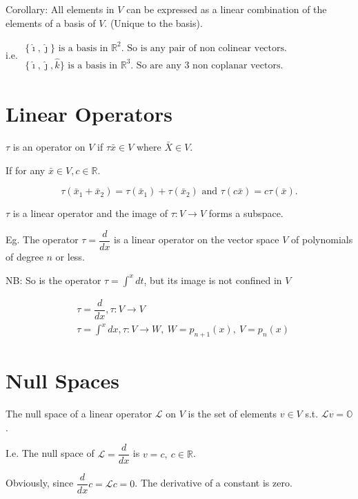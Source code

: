 \documentclass{report}
\begin{document}
Corollary: All elements in $V$ can be expressed as a linear combination of the elements of a basis of $V$. (Unique to the basis).

i.e. $\begin{array}{l}
     \text{$\{\hat{\imath}, \hat{\jmath}\}$ is a basis in $\mathbb{R}^2$. So is any pair of non colinear vectors. } \\
     \text{$\{\hat{\imath}, \hat{\jmath}, \hat{k}\}$ is a basis in $\mathbb{R}^3$. So are any 3 non coplanar vectors.}
\end{array}$

\section{Linear Operators}

$\tau$ is an operator on $V$ if $\tau \bar{x} \in V$ where $\bar{X} \in V$.

If for any $\bar{x} \in V, c \in \mathbb{R}$.

$$
\tau\left(\bar{x}_1+\bar{x}_2\right)=\tau\left(\bar{x}_1\right)+\tau\left(\bar{x}_2\right) \text { and } \tau(c \bar{x})=c \tau(\bar{x}).
$$


$\tau$ is a linear operator and the image of $\tau: V \rightarrow V$ forms a subspace.

Eg. The operator $\tau=\dfrac{d}{d x}$ is a linear operator on the vector space $V$ of polynomials of degree $n$ or less.

NB: So is the operator $\tau=\displaystyle\int^{x} d t$, but its image is not confined in $V$

$$
\begin{aligned}
& \tau=\dfrac{d}{d x}, \tau: V \rightarrow V \\
& \tau=\displaystyle\int^{x} d x, \tau: V \rightarrow W,\ W=p_{n+1}(x),\ V=p_{n}(x)
\end{aligned}
$$

\section{Null Spaces}

The null space of a linear operator $\mathcal{L}$ on $V$ is the set of elements $v \in V$ s.t. $\mathcal{L} v=\mathbb{O}$.

I.e. The null space of $\mathcal{L}=\dfrac{d}{d x}$ is $v=c,\ c \in \mathbb{R}$.

Obviously, since $\dfrac{d}{d x} c=\mathcal{L} c=0$. The derivative of a constant is zero.
\end{document}
